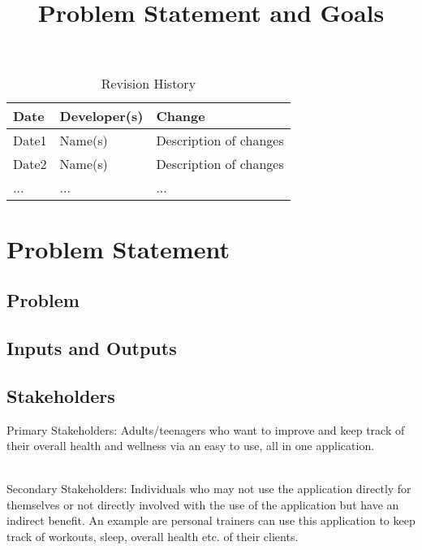 \documentclass[12pt,letterpaper]{article}
\title{Problem Statement and Goals\\\progname}
\author{\authname}
\date{}
\begin{document}
\maketitle

\begin{table}[hp]
\caption{Revision History} \label{TblRevisionHistory}
\begin{tabularx}{\textwidth}{llX}
\toprule
\textbf{Date} & \textbf{Developer(s)} & \textbf{Change}\\
\midrule
Date1 & Name(s) & Description of changes\\
Date2 & Name(s) & Description of changes\\
... & ... & ...\\
\bottomrule
\end{tabularx}
\end{table}

\section{Problem Statement}


\subsection{Problem}

\subsection{Inputs and Outputs}


\subsection{Stakeholders}

\par
Primary Stakeholders: Adults/teenagers who want to improve and keep track of their overall health and wellness via an easy to use, all in one application.

\noindent
\\
Secondary Stakeholders: Individuals who may not use the application directly for themselves or not directly involved with the use of the application but have an indirect benefit. An example are personal trainers can use this application to keep track of workouts, sleep, overall health etc. of their clients.
\end{document}

